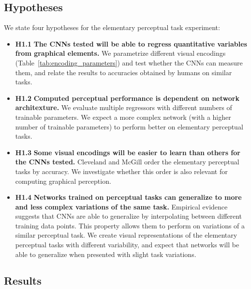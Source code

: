 %
\subsection{Hypotheses}

We state four hypotheses for the elementary perceptual task experiment:

\begin{itemize}
	\item \textbf{H1.1} \textbf{The CNNs tested will be able to regress quantitative variables from graphical elements.} We parametrize different visual encodings (Table~\ref{tab:encoding_parameters}) and test whether the CNNs can measure them, and relate the results to accuracies obtained by humans on similar tasks.
	\item \textbf{H1.2} \textbf{Computed perceptual performance is dependent on network architexture.} We evaluate multiple regressors with different numbers of trainable parameters. We expect a more complex network (with a higher number of trainable parameters) to perform better on elementary perceptual tasks.
	\item \textbf{H1.3} \textbf{Some visual encodings will be easier to learn than others for the CNNs tested.} Cleveland and McGill order the elementary perceptual tasks by accuracy. We investigate whether this order is also relevant for computing graphical perception.
	\item \textbf{H1.4} \textbf{Networks trained on perceptual tasks can generalize to more and less complex variations of the same task.} Empirical evidence suggests that CNNs are able to generalize by interpolating between different training data points. This property allows them to perform on variations of a similar perceptual task. We create visual representations of the elementary perceptual tasks with different variability, and expect that networks will be able to generalize when presented with slight task variations.
\end{itemize}

%	
%	


\subsection{Results}

